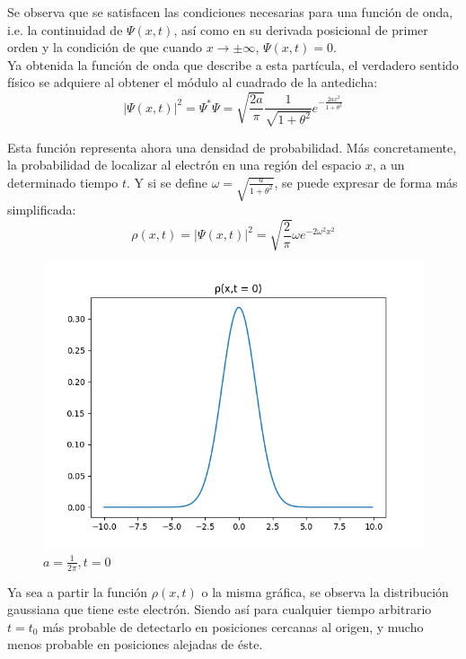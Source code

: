 Se observa que se satisfacen las condiciones necesarias para una función de onda, i.e. la continuidad de $\Psi(x,t)$,
así como en su derivada posicional de primer orden y la condición de que cuando $x\rightarrow\pm\infty$, $\Psi(x,t)=0$.\\

Ya obtenida la función de onda que describe a esta partícula, el verdadero sentido físico se adquiere al obtener el
módulo al cuadrado de la antedicha:
\begin{equation*}
    \lvert\Psi(x,t)\rvert^2 = \Psi^*\Psi = \sqrt{\frac{2a}{\pi}} \frac{1}{\sqrt{1+\theta^2}} e^{-\frac{2ax^2}{1+\theta^2}}
\end{equation*}

Esta función representa ahora una densidad de probabilidad. Más concretamente, la probabilidad de localizar al electrón
en una región del espacio $x$, a un determinado tiempo $t$. Y si se define $\omega=\sqrt{\frac{a}{1+\theta^2}}$, se puede
expresar de forma más simplificada:
\begin{equation}
    \rho(x,t) = \lvert\Psi(x,t)\rvert^2 = \sqrt{\frac{2}{\pi}} \omega e^{-2\omega^2x^2}
\end{equation}

\begin{figure}[H]
    \includegraphics[scale=0.45]{imagenes/graficas_particulalibre/rho(x,t).png}
    \caption{\emph{$a = \frac{1}{2\pi}, t = 0$}}
\end{figure}

Ya sea a partir la función $\rho(x,t)$ o la misma gráfica, se observa la distribución gaussiana que tiene este electrón.
Siendo así para cualquier tiempo arbitrario $t=t_{0}$ más probable de detectarlo en posiciones cercanas al origen, y mucho
menos probable en posiciones alejadas de éste.\\

